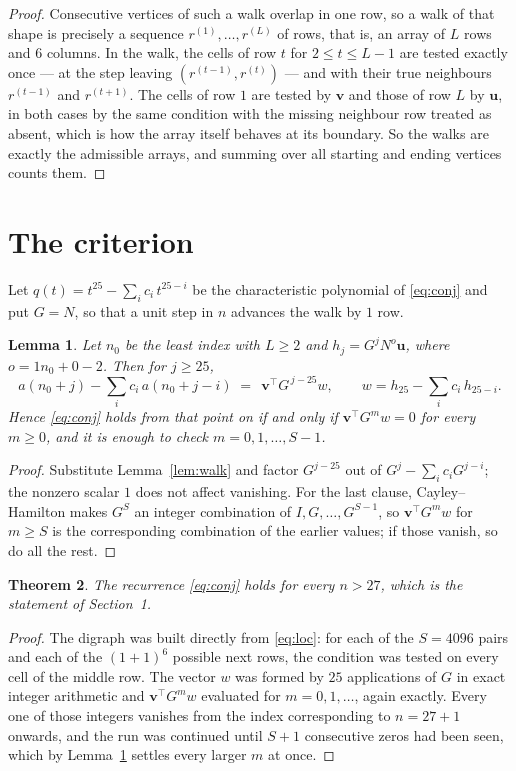 \documentclass[11pt,a4paper]{article}
\theoremstyle{plain}
\newtheorem{theorem}{Theorem}
\newtheorem{lemma}[theorem]{Lemma}
\theoremstyle{definition}
\begin{document}
\begin{proof}
Consecutive vertices of such a walk overlap in one row, so a walk of that shape is
precisely a sequence $r^{(1)},\dots,r^{(L)}$ of rows, that is, an array of $L$ rows
and $6$ columns. In the walk, the cells of row $t$ for $2\le t\le L-1$ are tested
exactly once --- at the step leaving $(r^{(t-1)},r^{(t)})$ --- and with their true
neighbours $r^{(t-1)}$ and $r^{(t+1)}$. The cells of row $1$ are tested by
$\mathbf{v}$ and those of row $L$ by $\mathbf{u}$, in both cases by the same condition
with the missing neighbour row treated as absent, which is how the array itself behaves at
its boundary. So the walks are exactly the admissible arrays, and summing over all starting
and ending vertices counts them.
\end{proof}

\section{The criterion}

Let $q(t)=t^{25}-\sum_i c_i\,t^{25-i}$ be the characteristic polynomial of
\eqref{eq:conj} and put $G=N$, so that a unit step in $n$ advances the walk by
$1$ row.

\begin{lemma}\label{lem:crit}
Let $n_0$ be the least index with $L\ge2$ and $h_j=G^{j}N^{o}\mathbf{u}$, where
$o=1n_0+0-2$. Then for $j\ge25$,
\[
a(n_0+j)-\sum_i c_i\,a(n_0+j-i)\;=\;\,\mathbf{v}^{\!\top}G^{\,j-25}w,
\qquad w=h_{25}-\sum_i c_i\,h_{25-i} .
\]
Hence \eqref{eq:conj} holds from that point on if and only if
$\mathbf{v}^{\!\top}G^{m}w=0$ for every $m\ge0$, and it is enough to check
$m=0,1,\dots,S-1$.
\end{lemma}

\begin{proof}
Substitute Lemma~\ref{lem:walk} and factor $G^{j-25}$ out of
$G^{j}-\sum_ic_iG^{j-i}$; the nonzero scalar $1$ does not affect
vanishing. For the last clause, Cayley--Hamilton makes $G^{S}$ an integer combination of
$I,G,\dots,G^{S-1}$, so $\mathbf{v}^{\!\top}G^{m}w$ for $m\ge S$ is the corresponding
combination of the earlier values; if those vanish, so do all the rest.
\end{proof}

\begin{theorem}
The recurrence \eqref{eq:conj} holds for every $n>27$, which is the statement of
Section~1.
\end{theorem}

\begin{proof}
The digraph was built directly from \eqref{eq:loc}: for each of the $S=4096$ pairs and each
of the $(1+1)^{6}$ possible next rows, the condition was tested on every cell of
the middle row. The vector $w$ was formed by $25$ applications of $G$ in exact integer
arithmetic and $\mathbf{v}^{\!\top}G^{m}w$ evaluated for $m=0,1,\dots$, again exactly.
Every one of those integers vanishes from the index corresponding to $n=27+1$ onwards,
and the run was continued until $S+1$ consecutive zeros had been seen, which by
Lemma~\ref{lem:crit} settles every larger $m$ at once.
\end{proof}
\end{document}
